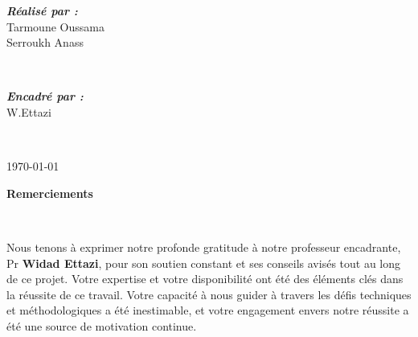 \documentclass[a4paper,12pt]{report}
\numberwithin{equation}{section}
\begin{document}
\begin{titlepage}
        \begin{minipage}{0.5\textwidth} %
            \begin{flushleft} \large %
            \emph{\textbf{Réalisé par :}}\\ %
            Tarmoune Oussama\\Serroukh Anass
            \end{flushleft}
        \end{minipage}
        ~
        \begin{minipage}{0.4\textwidth}
            \begin{flushright} \large
             \emph{\textbf{Encadré par :}} \\
             W.Ettazi \\
            \end{flushright}
        \end{minipage}\\[1cm]
        
        \vfill
        {\large \today\par} %
    
\end{titlepage}

\tableofcontents
\vspace{1cm}
\listoffigures
\newpage
\listoftables
\newpage

\vspace*{7cm}
\begin{center}
    {\huge\bfseries Remerciements\par} \
\end{center}
{\large \par Nous tenons à exprimer notre profonde gratitude à notre professeur encadrante, 
Pr \textbf{Widad Ettazi}, pour son soutien constant et ses conseils avisés tout au long de ce projet. 
Votre expertise et votre disponibilité ont été des éléments clés dans la réussite de ce travail. 
Votre capacité à nous guider à travers les défis techniques et méthodologiques a été inestimable, 
et votre engagement envers notre réussite a été une source de motivation continue.\par}
\newpage
\end{document}
